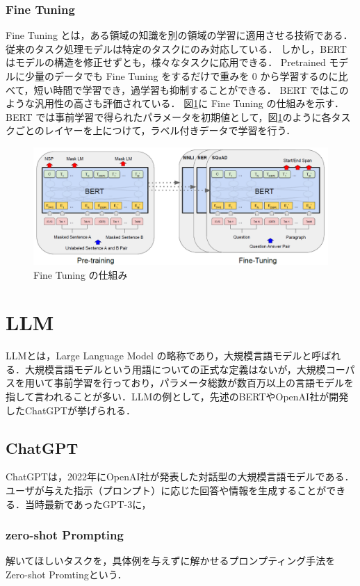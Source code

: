 \subsubsection{Fine Tuning}
Fine Tuning とは，ある領域の知識を別の領域の学習に適用させる技術である．
従来のタスク処理モデルは特定のタスクにのみ対応している．
しかし，BERT はモデルの構造を修正せずとも，様々なタスクに応用できる．
Pretrained モデルに少量のデータでも Fine Tuning をするだけで重みを 0 から学習するのに比べて，短い時間で学習でき，過学習も抑制することができる．
BERT ではこのような汎用性の高さも評価されている．
図\ref{finetuning}に Fine Tuning の仕組みを示す．
BERT では事前学習で得られたパラメータを初期値として，図\ref{finetuning}のように各タスクごとのレイヤーを上につけて，ラベル付きデータで学習を行う．

\begin{figure}[H]
	\centering
	\includegraphics[width=120mm]{image/BERT-finetuning.png}
	\caption{Fine Tuning の仕組み}
	\label{finetuning}
\end{figure}



\section{LLM \label{c4s6}}
LLMとは，Large Language Model の略称であり，大規模言語モデルと呼ばれる．大規模言語モデルという用語についての正式な定義はないが，大規模コーパスを用いて事前学習を行っており，パラメータ総数が数百万以上の言語モデルを指して言われることが多い．LLMの例として，先述のBERTやOpenAI社が開発したChatGPTが挙げられる．

\subsection{ChatGPT}
ChatGPTは，2022年にOpenAI社が発表した対話型の大規模言語モデルである．ユーザが与えた指示（プロンプト）に応じた回答や情報を生成することができる．当時最新であったGPT-3に，

\subsubsection{zero-shot Prompting}
解いてほしいタスクを，具体例を与えずに解かせるプロンプティング手法をZero-shot Promtingという．

